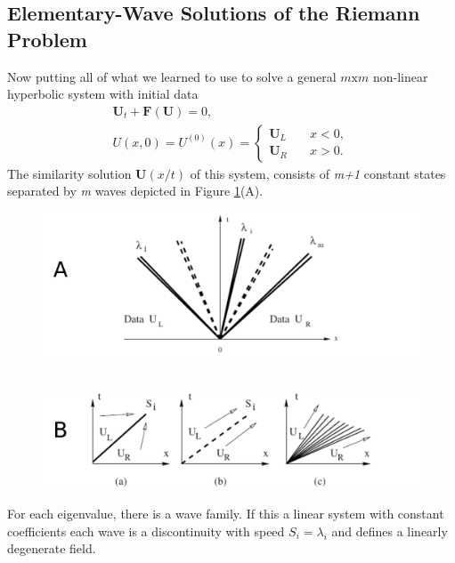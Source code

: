 \documentclass[]{article}
\begin{document}
	\subsection{Elementary-Wave Solutions of the Riemann Problem}
		Now putting all of what we learned to use to solve a general $ m \mbox{x} m $ non-linear hyperbolic system with initial data
		\begin{equation}
			\begin{aligned}
				\textbf{U}_t + \textbf{F}(\textbf{U}) = 0 \mbox{, } \\
				U(x,0) = U^{(0)}(x) = \left\{
				\begin{array}{ll}
					\textbf{U}_L & \quad x < 0, \\
					\textbf{U}_R & \quad x > 0.
				\end{array}
			\right.
			\end{aligned}
			\label{RPEquation}
		\end{equation}
		The similarity solution $ \textbf{U}(x/t) $ of this system, consists of \textit{m+1} constant states separated by \textit{m} waves depicted in Figure \ref{ElementaryWaveSolutions}(A).
			
		\begin{figure}[h] 	
			\centering
			\includegraphics[scale=.55]{ElementaryWaveSolutions}
			\caption{}
			\label{ElementaryWaveSolutions}
		\end{figure}
		For each eigenvalue, there is a wave family. If this a linear system with constant coefficients each wave is a discontinuity with speed $ S_i = \lambda_i $ and defines a linearly degenerate field.
		
\end{document}

